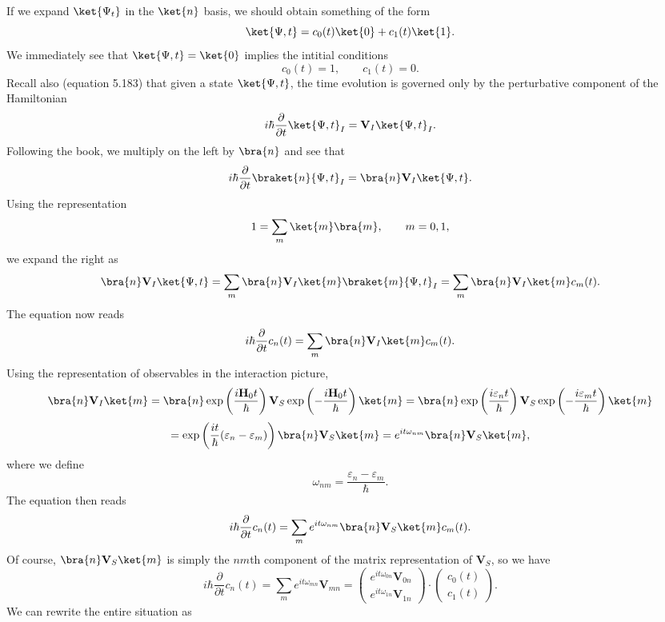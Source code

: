 \documentclass[11pt, letterpaper]{article}
\begin{document}
If we expand $\ket{\Psi _t}$ in the $\ket{n}$ basis, we should obtain something of the form
\[
	\ket{\Psi ,t}=c_0(t)\ket{0}+c_1(t)\ket{1}
.\]
We immediately see that $\ket{\Psi ,t}=\ket{0}$ implies the intitial conditions
\[
	c_0(t)=1,\qquad c_1(t)=0
.\]
Recall also (equation 5.183) that given a state $\ket{\Psi ,t}$, the time evolution is governed only by the perturbative component of the Hamiltonian
\[
	i\hbar \frac{\partial }{\partial t} \ket{\Psi ,t}_I=\mathbf{V}_I \ket{\Psi,t}_I
.\]
Following the book, we multiply on the left by $\bra{n}$ and see that
\[
	i\hbar \frac{\partial }{\partial t} \braket{n}{\Psi ,t}_I=\bra{n} \mathbf{V}_I\ket{\Psi ,t}
.\]
Using the representation
\[
	1=\sum_{m} \ket{m}\bra{m},\qquad m=0,1,
\]
we expand the right as
\[
	\bra{n}\mathbf{V} _I\ket{\Psi ,t}=\sum_{m} \bra{n}\mathbf{V} _I\ket{m}\braket{m}{\Psi ,t}_I=\sum_{m}\bra{n}\mathbf{V} _I\ket{m}c_m(t)
.\]
The equation now reads
\[
	i\hbar \frac{\partial }{\partial t} c_n(t)=\sum_{m} \bra{n}\mathbf{V} _I\ket{m}c_m(t)
.\]
Using the representation of observables in the interaction picture,
\[
	\bra{n}\mathbf{V} _I\ket{m}=\bra{n} \exp \left( \frac{i \mathbf{H} _0t}{\hbar}  \right) \mathbf{V}_S \exp \left( -\frac{i \mathbf{H} _0t}{\hbar}  \right) \ket{m}=\bra{n}\exp \left( \frac{i\varepsilon _nt}{\hbar}  \right) \mathbf{V} _S \exp \left( -\frac{i \varepsilon _m t}{\hbar}  \right) \ket{m}
\]
\[
	=\exp \left( \frac{it}{\hbar} (\varepsilon _n-\varepsilon _m) \right) \bra{n}\mathbf{V} _S\ket{m}=e^{it\omega_{nm} } \bra{n}\mathbf{V} _S\ket{m},
\]
where we define
\[
	\omega_{nm} =\frac{\varepsilon _n-\varepsilon _m}{\hbar} 
.\]
The equation then reads
\[
	i\hbar \frac{\partial }{\partial t} c_n(t)=\sum_{m} e^{it\omega_{nm} } \bra{n}\mathbf{V} _S\ket{m}c_m(t)
.\]
Of course, $\bra{n}\mathbf{V} _S\ket{m}$ is simply the $nm$th component of the matrix representation of $\mathbf{V} _S$, so we have
\[
	i\hbar \frac{\partial }{\partial t} c_n(t)=\sum_{m} e^{it\omega _{mn} } \mathbf{V}_{mn} =\begin{pmatrix}
	e^{it\omega_{0n} }\mathbf{V}_{0n}   \\
	e^{it \omega _{1n}} \mathbf{V} _{1n} 
	\end{pmatrix}\cdot \begin{pmatrix}
	c_0(t)  \\
	c_1(t)
	\end{pmatrix}
.\]
We can rewrite the entire situation as
\end{document}
